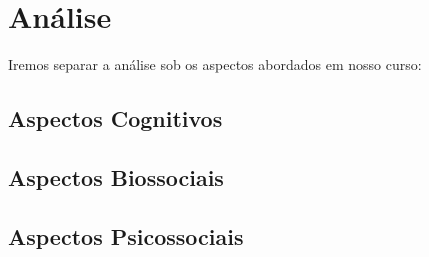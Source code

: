 \section{Análise}

Iremos separar a análise sob os aspectos abordados em nosso curso:

\subsection{Aspectos Cognitivos}

\subsection{Aspectos Biossociais}

\subsection{Aspectos Psicossociais}

